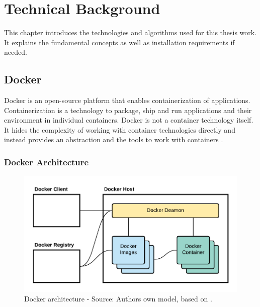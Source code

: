 \chapter{Technical Background}
\label{chap:04_background}

This chapter introduces the technologies and algorithms used for this thesis work. It explains the fundamental concepts as well as installation requirements if needed.

\section{Docker}
\label{sec:04_docker}
Docker is an open-source platform that enables containerization of applications. Containerization is a technology to package, ship and run applications and their environment in individual containers.
Docker is not a container technology itself. It hides the complexity of working with container technologies directly and instead provides an abstraction and the tools to work with containers \cite{Nickoloff2019Docker, Bullington2020Docker, Potdar2020Docker}.


\subsection{Docker Architecture}
\label{subsec:04_docker_architecture}
\begin{figure}[h]
\centering
\includegraphics[scale=1]{images/04_technical_background/docker/docker_architecture}
\caption{Docker architecture - Source: Authors own model, based on \cite{Docker2020Docs}.}
\label{fig:04_docker_architecture_architecture}
\end{figure}

